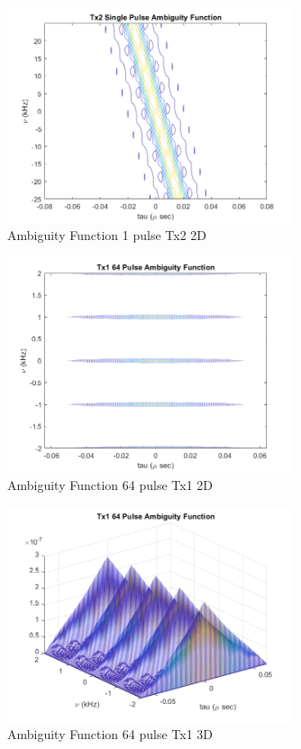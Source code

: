 \documentclass{article}
\begin{document}
\begin{figure}[H]
    \centering
    \includegraphics[width=0.75\textwidth]{figures/ambiguityFunction_1pulse_Tx2_2D.png}
    \caption{Ambiguity Function 1 pulse Tx2 2D}
    \label{fig:AF1_Tx2_2D}
\end{figure}

\begin{figure}[H]
    \centering
    \includegraphics[width=0.75\textwidth]{figures/ambiguityFunction_64pulse_Tx1_2D.png}
    \caption{Ambiguity Function 64 pulse Tx1 2D}
    \label{fig:AF64_Tx1_2D}
\end{figure}

\begin{figure}[H]
    \centering
    \includegraphics[width=0.75\textwidth]{figures/ambiguityFunction_64pulse_Tx1_3D.png}
    \caption{Ambiguity Function 64 pulse Tx1 3D}
    \label{fig:AF64_Tx1_3D}
\end{figure}
\end{document}
